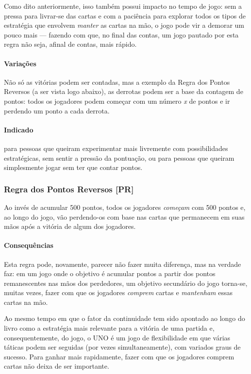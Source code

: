 Como dito anteriormente, isso também possui impacto no tempo de jogo: sem a pressa para livrar-se das cartas e com a paciência para explorar todos os tipos de estratégia que envolvem \textit{manter} as cartas na mão, o jogo pode vir a demorar um pouco mais --- fazendo com que, no final das contas, um jogo pautado por esta regra não seja, afinal de contas, mais rápido.

\paragraph{Variações}

Não só as vitórias podem ser contadas, mas a exemplo da Regra dos Pontos Reversos (a ser vista logo abaixo), as derrotas podem ser a base da contagem de pontos: todos os jogadores podem começar com um número \emph{x} de pontos e ir perdendo um ponto a cada derrota. 

\paragraph{Indicado}

para pessoas que queiram experimentar mais livremente com possibilidades estratégicas, sem sentir a pressão da pontuação, ou para pessoas que queiram simplesmente jogar sem ter que contar pontos.

\subsubsection{Regra dos Pontos Reversos [PR]}

Ao invés de acumular 500 pontos, todos os jogadores \textit{começam} com 500 pontos e, ao longo do jogo, vão perdendo-os com base nas cartas que permanecem em suas mãos após a vitória de algum dos jogadores.

\paragraph{Consequências}

Esta regra pode, novamente, parecer não fazer muita diferença, mas na verdade faz: em um jogo onde o objetivo é acumular pontos a partir dos pontos remanescentes nas mãos dos perdedores, um objetivo secundário do jogo torna-se, muitas vezes, fazer com que os jogadores \textit{comprem} cartas e \textit{mantenham} essas cartas na mão.

Ao mesmo tempo em que o fator da continuidade tem sido apontado ao longo do livro como a estratégia mais relevante para a vitória de uma partida e, consequentemente, do jogo, o UNO é um jogo de flexibilidade em que várias táticas podem ser seguidas (por vezes simultaneamente), com variados graus de sucesso. Para ganhar mais rapidamente, fazer com que os jogadores comprem cartas não deixa de ser importante.


